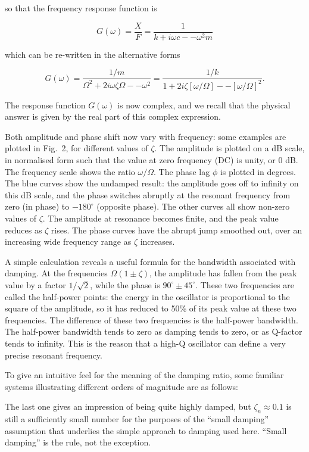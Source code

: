   so that the frequency response function is 

  $$G(\omega) = \frac{X}{F} = \frac{1}{k+i \omega c -- \omega^2 m} \tag{10} $$ 

  which can be re-written in the alternative forms 

  $$G(\omega) = \frac{1/m}{\Omega^2+2i \omega \zeta \Omega -- \omega^2 }= 
  \frac{1/k}{1+2i \zeta [\omega/\Omega] -- [\omega/\Omega]^2 }. \tag{11} $$ 

  The response function $G(\omega)$ is now complex, and we recall that the 
  physical answer is given by the real part of this complex expression. 

  Both amplitude and phase shift now vary with frequency: some examples are 
  plotted in Fig.\ 2, for different values of $\zeta$. The amplitude is plotted 
  on a dB scale, in normalised form such that the value at zero frequency (DC) 
  is unity, or 0 dB. The frequency scale shows the ratio $\omega/\Omega$. The 
  phase lag $\phi$ is plotted in degrees. The blue curves show the undamped 
  result: the amplitude goes off to infinity on this dB scale, and the phase 
  switches abruptly at the resonant frequency from zero (in phase) to 
  $-180^\circ$ (opposite phase). The other curves all show non-zero values of 
  $\zeta$. The amplitude at resonance becomes finite, and the peak value 
  reduces as $\zeta$ rises. The phase curves have the abrupt jump smoothed out, 
  over an increasing wide frequency range as $\zeta$ increases. 

  A simple calculation reveals a useful formula for the bandwidth associated 
  with damping. At the frequencies $\Omega(1 \pm \zeta)$, the amplitude has 
  fallen from the peak value by a factor $1/\sqrt{2}$, while the phase is 
  $90^\circ \pm 45^\circ$. These two frequencies are called the half-power 
  points: the energy in the oscillator is proportional to the square of the 
  amplitude, so it has reduced to 50\% of its peak value at these two 
  frequencies. The difference of these two frequencies is the half-power 
  bandwidth. The half-power bandwidth tends to zero as damping tends to zero, 
  or as Q-factor tends to infinity. This is the reason that a high-Q oscillator 
  can define a very precise resonant frequency. 

  To give an intuitive feel for the meaning of the damping ratio, some familiar 
  systems illustrating different orders of magnitude are as follows: 

  The last one gives an impression of being quite highly damped, but $\zeta_n 
  \approx 0.1$ is still a sufficiently small number for the purposes of the 
  ``small damping'' assumption that underlies the simple approach to damping 
  used here. ``Small damping'' is the rule, not the exception. 

